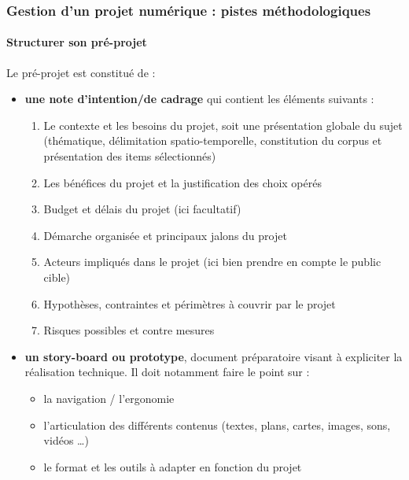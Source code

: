 \documentclass[xcolor=table]{beamer}
\begin{document}
\begin{frame}[allowframebreaks]
\frametitle{Gestion d'un projet num\'erique : pistes m\'ethodologiques}
\framesubtitle{Structurer son pr\'e-projet}
Le pr\'e-projet est constitu\'e de : 
\begin{itemize}
    \item \textbf{une note d'intention/de cadrage} qui contient les \'el\'ements suivants :
    \begin{enumerate}
        \item Le contexte et les besoins du projet, soit une pr\'esentation globale du sujet (th\'ematique, d\'elimitation spatio-temporelle, constitution du corpus et pr\'esentation des items s\'electionn\'es)
        \item Les b\'en\'efices du projet et la justification des choix op\'er\'es
        \item Budget et d\'elais du projet (ici facultatif)
        \item D\'emarche organis\'ee et principaux jalons du projet
        \item Acteurs impliqu\'es dans le projet (ici bien prendre en compte le public cible)
        \item Hypoth\`eses, contraintes et p\'erim\`etres \`a couvrir par le projet
        \item Risques possibles et contre mesures
    \end{enumerate}
\end{itemize}
\begin{itemize}
    \item \textbf{un story-board ou prototype}, document pr\'eparatoire visant \`a expliciter la r\'ealisation technique. Il doit notamment faire le point sur  :
    \begin{itemize}
        \item la navigation / l'ergonomie
        \item l'articulation des diff\'erents contenus (textes, plans, cartes, images, sons, vid\'eos \ldots)
        \item le format et les outils \`a adapter en fonction du projet
    \end{itemize}
\end{itemize}
\end{frame}
\end{document}
